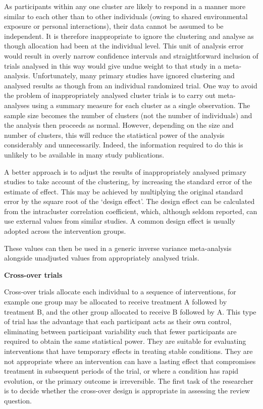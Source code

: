 \documentclass[
  11pt,
  a4paper,
  DIV=11,
  numbers=noendperiod]{scrreprt}
\begin{document}
As participants within any one cluster are likely to respond in a manner
more similar to each other than to other individuals (owing to shared
environmental exposure or personal interactions), their data cannot be
assumed to be independent. It is therefore inappropriate to ignore the
clustering and analyse as though allocation had been at the individual
level. This unit of analysis error would result in overly narrow
confidence intervals and straightforward inclusion of trials analysed in
this way would give undue weight to that study in a meta-analysis.
Unfortunately, many primary studies have ignored clustering and analysed
results as though from an individual randomized trial. One way to avoid
the problem of inappropriately analysed cluster trials is to carry out
meta-analyses using a summary measure for each cluster as a single
observation. The sample size becomes the number of clusters (not the
number of individuals) and the analysis then proceeds as normal.
However, depending on the size and number of clusters, this will reduce
the statistical power of the analysis considerably and unnecessarily.
Indeed, the information required to do this is unlikely to be available
in many study publications.

A better approach is to adjust the results of inappropriately analysed
primary studies to take account of the clustering, by increasing the
standard error of the estimate of effect. This may be achieved by
multiplying the original standard error by the square root of the
`design effect'. The design effect can be calculated from the
intracluster correlation coefficient, which, although seldom reported,
can use external values from similar studies. A common design effect is
usually adopted across the intervention groups.

These values can then be used in a generic inverse variance
meta-analysis alongside unadjusted values from appropriately analysed
trials.

\textbf{Cross-over trials}

Cross-over trials allocate each individual to a sequence of
interventions, for example one group may be allocated to receive
treatment A followed by treatment B, and the other group allocated to
receive B followed by A. This type of trial has the advantage that each
participant acts as their own control, eliminating between participant
variability such that fewer participants are required to obtain the same
statistical power. They are suitable for evaluating interventions that
have temporary effects in treating stable conditions. They are not
appropriate where an intervention can have a lasting effect that
compromises treatment in subsequent periods of the trial, or where a
condition has rapid evolution, or the primary outcome is irreversible.
The first task of the researcher is to decide whether the cross-over
design is appropriate in assessing the review question.
\end{document}
